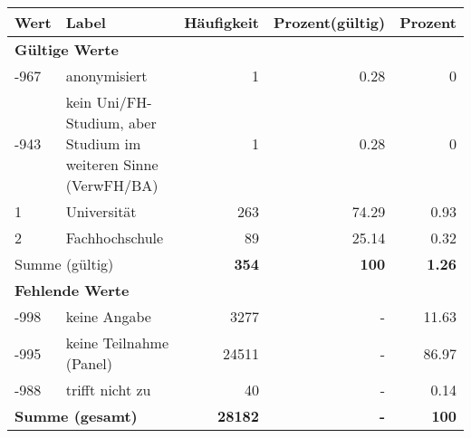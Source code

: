      \begin{longtable}{lXrrr}
     \toprule
     \textbf{Wert} & \textbf{Label} & \textbf{Häufigkeit} & \textbf{Prozent(gültig)} & \textbf{Prozent} \\
     \endhead
     \midrule
     \multicolumn{5}{l}{\textbf{Gültige Werte}}\\

     -967 &
     \multicolumn{1}{X}{ anonymisiert   } &


       \num{1} &
       \num[round-mode=places,round-precision=2]{0.28} &
         \num[round-mode=places,round-precision=2]{0} \\

     -943 &
     \multicolumn{1}{X}{ kein Uni/FH-Studium, aber Studium im weiteren Sinne (VerwFH/BA)   } &


       \num{1} &
       \num[round-mode=places,round-precision=2]{0.28} &
         \num[round-mode=places,round-precision=2]{0} \\

     1 &
     \multicolumn{1}{X}{ Universität   } &


       \num{263} &
       \num[round-mode=places,round-precision=2]{74.29} &
         \num[round-mode=places,round-precision=2]{0.93} \\

     2 &
     \multicolumn{1}{X}{ Fachhochschule   } &


       \num{89} &
       \num[round-mode=places,round-precision=2]{25.14} &
         \num[round-mode=places,round-precision=2]{0.32} \\
     \midrule
     \multicolumn{2}{l}{Summe (gültig)} &
       \textbf{\num{354}} &
     \textbf{\num{100}} &
       \textbf{\num[round-mode=places,round-precision=2]{1.26}} \\
     \multicolumn{5}{l}{\textbf{Fehlende Werte}}\\
       -998 &
       keine Angabe &
         \num{3277} &
        - &
         \num[round-mode=places,round-precision=2]{11.63} \\
       -995 &
       keine Teilnahme (Panel) &
         \num{24511} &
        - &
         \num[round-mode=places,round-precision=2]{86.97} \\
       -988 &
       trifft nicht zu &
         \num{40} &
        - &
         \num[round-mode=places,round-precision=2]{0.14} \\
     \midrule
     \multicolumn{2}{l}{\textbf{Summe (gesamt)}} &
          \textbf{\num{28182}} &
        \textbf{-} &
        \textbf{\num{100}} \\
     \bottomrule
     \end{longtable}
     

